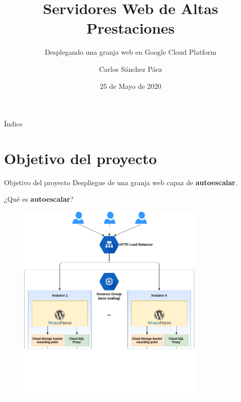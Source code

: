 \documentclass{beamer}
\title{Servidores Web de Altas Prestaciones}
\date{25 de Mayo de 2020}
\subtitle{Desplegando una granja web en Google Cloud Platform}
\author{Carlos Sánchez Páez}
\begin{document}
\centering
\begin{frame}
 \titlepage
\end{frame}

\begin{frame}{Índice}
 \tableofcontents
\end{frame}

\section{Objetivo del proyecto}

\begin{frame}[fragile]{Objetivo del proyecto}
  Despliegue de una granja web capaz de \textbf{autoescalar}.
\end{frame}

\begin{frame}[fragile]{¿Qué es \textbf{autoescalar}?}
  \begin{figure}[H]
    \centering
    \includegraphics[width =0.8\textwidth]{project/autoscaling.png}
  \end{figure}
\end{frame}
\end{document}
